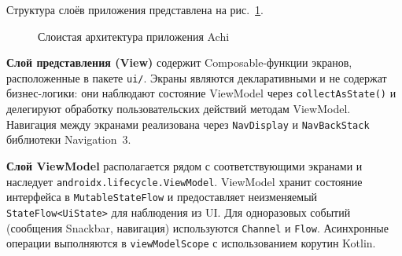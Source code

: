 \documentclass[../main.tex]{subfiles}
\begin{document}
Структура слоёв приложения представлена на рис.~\ref{pic:architecture-layers}.

\begin{figure}[H]
	\begin{center}
		\captionsetup{justification=centering}
		\caption{Слоистая архитектура приложения Achi}
		\label{pic:architecture-layers}
	\end{center}
\end{figure}

\textbf{Слой представления (View)} содержит Composable-функции экранов, расположенные в пакете \texttt{ui/}. Экраны являются декларативными и не содержат бизнес-логики: они наблюдают состояние ViewModel через \texttt{collectAsState()} и делегируют обработку пользовательских действий методам ViewModel. Навигация между экранами реализована через \texttt{NavDisplay} и \texttt{NavBackStack} библиотеки Navigation~3.

\textbf{Слой ViewModel} располагается рядом с соответствующими экранами и наследует \texttt{androidx.lifecycle.ViewModel}. ViewModel хранит состояние интерфейса в \texttt{MutableStateFlow} и предоставляет неизменяемый \texttt{StateFlow<UiState>} для наблюдения из UI. Для одноразовых событий (сообщения Snackbar, навигация) используются \texttt{Channel} и \texttt{Flow}. Асинхронные операции выполняются в \texttt{viewModelScope} с использованием корутин Kotlin.
\end{document}
